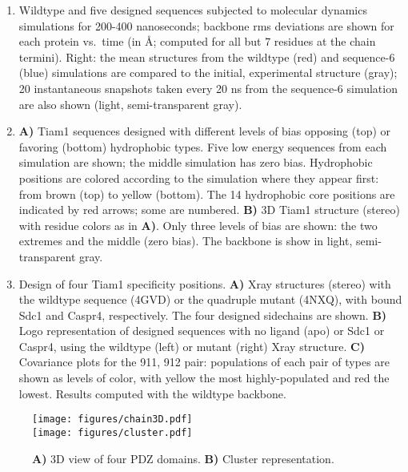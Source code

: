 \documentclass[12pt]{article}
\begin{document}
\begin{enumerate}
\item \label{fig:mdruns}
Wildtype and five designed sequences subjected to molecular dynamics simulations for 200-400 nanoseconds; backbone rms
deviations are shown for each protein vs.\ time (in \AA; computed for all but 7 residues at the chain termini). Right:
the mean structures from the wildtype (red) and sequence-6 (blue) simulations are compared to the initial, experimental 
structure (gray); 20 instantaneous snapshots taken every 20 ns from the sequence-6 simulation are also shown (light,
semi-transparent gray).

\item \label{fig:titrate}
{\bf A)} Tiam1 sequences designed with different levels of bias opposing (top) or favoring (bottom) hydrophobic types.
Five low energy sequences from each simulation are shown; the middle simulation has zero bias. Hydrophobic positions
are colored according to the simulation where they appear first: from brown (top) to yellow (bottom). The 14 hydrophobic
core positions are indicated by red arrows; some are numbered. {\bf B)} 3D Tiam1 structure (stereo) with residue colors
as in {\bf A)}. Only three levels of bias are shown: the two extremes and the middle (zero bias). The backbone is show in
light, semi-transparent gray.

\item \label{fig:tiamQM} 
Design of four Tiam1 specificity positions. {\bf A)} Xray structures (stereo) with the wildtype sequence (4GVD) or the
quadruple mutant (4NXQ), with bound Sdc1 and Caspr4, respectively. The four designed sidechains are shown. {\bf B)} 
Logo representation of designed sequences with no ligand (apo) or Sdc1 or Caspr4, using the wildtype (left) or mutant (right)
Xray structure. {\bf C)} Covariance plots for the 911, 912 pair: populations of each pair of types are shown as levels of
color, with yellow the most highly-populated and red the lowest. Results computed with the wildtype backbone.

\end{enumerate}


\clearpage
\pagebreak

\begin{figure}[!h]
\begin{center}
\texttt{[image: figures/chain3D.pdf]} \\
\texttt{[image: figures/cluster.pdf]} 
\end{center}
\caption[width=1cm]{{\bf A)} 3D view of four PDZ domains. 
{\bf B)} Cluster representation.}
\end{figure}
\end{document}
